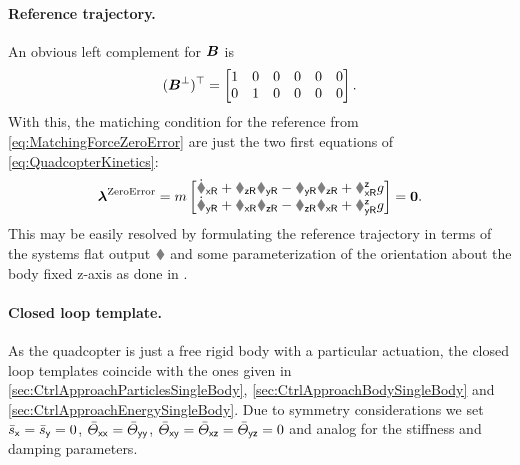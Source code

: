 \paragraph{Reference trajectory.}
An obvious left complement for $\boldsymbol{B}$ is
\begin{align}
 (\boldsymbol{B}^\bot)^\top = \begin{bmatrix} 1 & 0 & 0 & 0 & 0 & 0 \\ 0 & 1 & 0 & 0 & 0 & 0 \end{bmatrix}.
\end{align}
With this, the matiching condition for the reference from \eqref{eq:MatchingForceZeroError} are just the two first equations of \eqref{eq:QuadcopterKinetics}:
\begin{align}
 \tuple{\lambda}^{\text{ZeroError}} = m \begin{bmatrix} \vxRd + \vzR\wyR-\vyR\wzR + \RRzx\gravityAccConst \\ \vyRd + \vxR\wzR-\vzR\wxR + \RRzy \gravityAccConst \end{bmatrix} = \tuple{0}
 .
\end{align}
This may be easily resolved by formulating the reference trajectory in terms of the systems flat output $\r$ and some parameterization of the orientation about the body fixed z-axis as done in \cite{Konz:QuadrotorMovingFrame}.

\paragraph{Closed loop template.}
As the quadcopter is just a free rigid body with a particular actuation, the closed loop templates coincide with the ones given in \autoref{sec:CtrlApproachParticlesSingleBody}, \autoref{sec:CtrlApproachBodySingleBody} and \autoref{sec:CtrlApproachEnergySingleBody}.
Due to symmetry considerations we set $\bar{s}_{\mathsf{x}} = \bar{s}_{\mathsf{y}} = 0$, $\bar{\varTheta}_{\mathsf{x}\mathsf{x}}=\bar{\varTheta}_{\mathsf{y}\mathsf{y}}$, $\bar{\varTheta}_{\mathsf{x}\mathsf{y}}=\bar{\varTheta}_{\mathsf{x}\mathsf{z}}=\bar{\varTheta}_{\mathsf{y}\mathsf{z}}=0$ and analog for the stiffness and damping parameters.

